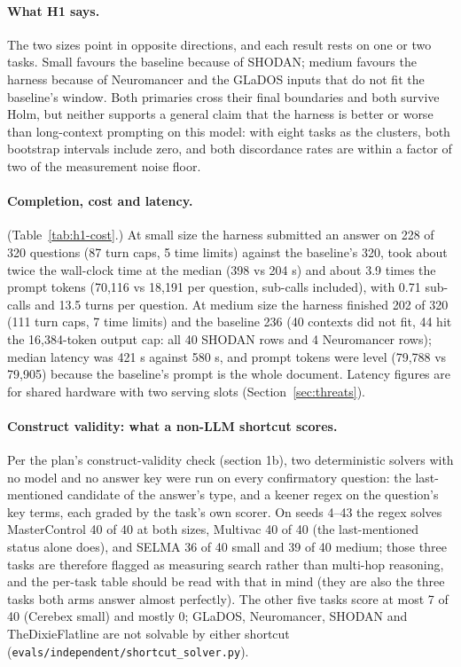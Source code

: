 \documentclass[11pt]{article}
\newcommand{\code}[1]{\texttt{#1}}
\begin{document}
\paragraph{What H1 says.} The two sizes point in opposite directions, and each result
rests on one or two tasks. Small favours the baseline because of SHODAN; medium favours
the harness because of Neuromancer and the GLaDOS inputs that do not fit the baseline's
window. Both primaries cross their final boundaries and both survive Holm, but neither
supports a general claim that the harness is better or worse than long-context prompting
on this model: with eight tasks as the clusters, both bootstrap intervals include zero,
and both discordance rates are within a factor of two of the measurement noise floor.

\paragraph{Completion, cost and latency.} (Table~\ref{tab:h1-cost}.) At small size the
harness submitted an answer on 228 of 320 questions (87 turn caps, 5 time limits) against
the baseline's 320, took about twice the wall-clock time at the median (398 vs 204 s)
and about 3.9 times the prompt tokens (70,116 vs 18,191 per question, sub-calls
included), with 0.71 sub-calls and 13.5 turns per question. At medium size the harness
finished 202 of 320 (111 turn caps, 7 time limits) and the baseline 236 (40 contexts did
not fit, 44 hit the 16,384-token output cap: all 40 SHODAN rows and 4 Neuromancer rows);
median latency was 421 s against 580 s, and prompt tokens were level (79,788 vs
79,905) because the baseline's prompt is the whole document. Latency figures are for
shared hardware with two serving slots (Section~\ref{sec:threats}).

\paragraph{Construct validity: what a non-LLM shortcut scores.} Per the plan's
construct-validity check (section 1b), two deterministic solvers with no model and no
answer key were run on every confirmatory question: the last-mentioned candidate of the
answer's type, and a keener regex on the question's key terms, each graded by the
task's own scorer. On seeds 4--43 the regex solves MasterControl 40 of 40 at both sizes,
Multivac 40 of 40 (the last-mentioned status alone does), and SELMA 36 of 40 small and
39 of 40 medium; those three tasks are therefore flagged as measuring search rather than
multi-hop reasoning, and the per-task table should be read with that in mind (they are
also the three tasks both arms answer almost perfectly). The other five tasks score at
most 7 of 40 (Cerebex small) and mostly 0; GLaDOS, Neuromancer, SHODAN and
TheDixieFlatline are not solvable by either shortcut
(\code{evals/independent/shortcut\_solver.py}).
\end{document}
